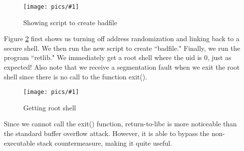 \documentclass[11pt]{article}
\newcommand{\fig}[2]{ 
\begin{figure}[h]
	\centering
	\caption{#2}
	\texttt{[image: pics/\#1]}
	\label{fig:#1}
\end{figure} 
}
\begin{document}
\fig{task5.2}{Showing script to create badfile}

\newpage
Figure \ref{fig:task5.3} first shows us turning off address randomization and linking back to a secure shell. We then run the new script to create ``badfile." Finally, we run the program ``retlib." We immediately get a root shell where the uid is 0, just as expected! Also note that we receive a segmentation fault when we exit the root shell since there is no call to the function exit().

\fig{task5.3}{Getting root shell}

Since we cannot call the exit() function, return-to-libc is more noticeable than the standard buffer overflow attack. However, it is able to bypass the non-executable stack countermeasure, making it quite useful.
\end{document}

